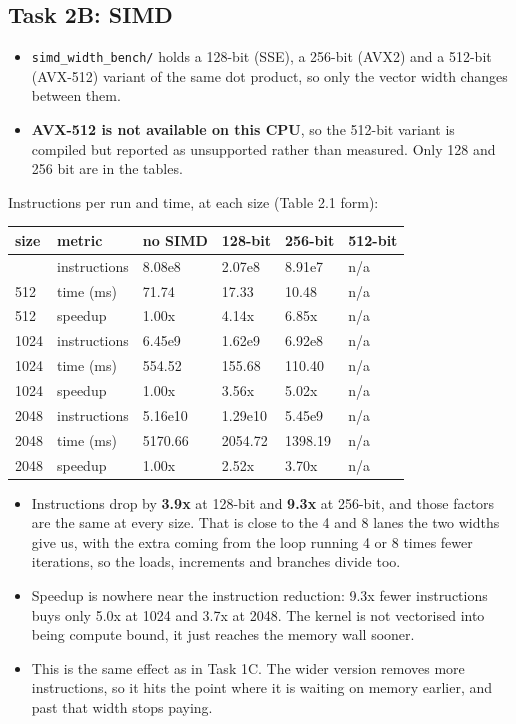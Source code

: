 \documentclass[
  10pt,
]{article}
\newcounter{none} %
\begin{document}
\subsection{Task 2B: SIMD}\label{task-2b}

\begin{itemize}
\item
  \texttt{simd\_width\_bench/} holds a 128-bit (SSE), a 256-bit (AVX2) and a
  512-bit (AVX-512) variant of the same dot product, so only the vector width
  changes between them.

\item
  \textbf{AVX-512 is not available on this CPU}, so the 512-bit variant is
  compiled but reported as unsupported rather than measured. Only 128 and 256
  bit are in the tables.
\end{itemize}

Instructions per run and time, at each size (Table 2.1 form):

{\def\LTcaptype{none} %
\begin{longtable}[]{@{}llllll@{}}
\toprule\noalign{}
size & metric & no SIMD & 128-bit & 256-bit & 512-bit \\
\midrule\noalign{}
\endhead
\bottomrule\noalign{}
\endlastfoot
512 & instructions & 8.08e8 & 2.07e8 & 8.91e7 & n/a \\
512 & time (ms) & 71.74 & 17.33 & 10.48 & n/a \\
512 & speedup & 1.00x & 4.14x & 6.85x & n/a \\
1024 & instructions & 6.45e9 & 1.62e9 & 6.92e8 & n/a \\
1024 & time (ms) & 554.52 & 155.68 & 110.40 & n/a \\
1024 & speedup & 1.00x & 3.56x & 5.02x & n/a \\
2048 & instructions & 5.16e10 & 1.29e10 & 5.45e9 & n/a \\
2048 & time (ms) & 5170.66 & 2054.72 & 1398.19 & n/a \\
2048 & speedup & 1.00x & 2.52x & 3.70x & n/a \\
\end{longtable}
}

\begin{itemize}
\item
  Instructions drop by \textbf{3.9x} at 128-bit and \textbf{9.3x} at 256-bit,
  and those factors are the same at every size. That is close to the 4 and 8
  lanes the two widths give us, with the extra coming from the loop running 4 or
  8 times fewer iterations, so the loads, increments and branches divide too.

\item
  Speedup is nowhere near the instruction reduction: 9.3x fewer instructions
  buys only 5.0x at 1024 and 3.7x at 2048. The kernel is not vectorised into
  being compute bound, it just reaches the memory wall sooner.

\item
  This is the same effect as in Task 1C. The wider version removes more
  instructions, so it hits the point where it is waiting on memory earlier, and
  past that width stops paying.
\end{itemize}
\end{document}
